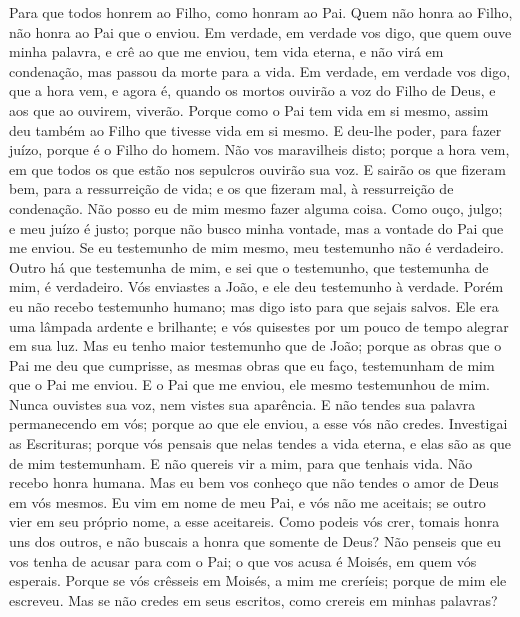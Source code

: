 {Para que todos honrem ao Filho, como honram ao Pai. Quem não honra ao Filho, não honra ao Pai que o enviou.
Em verdade, em verdade vos digo, que quem ouve minha palavra, e crê ao que me enviou, tem vida eterna, e não virá em condenação, mas passou da morte para a vida.
Em verdade, em verdade vos digo, que a hora vem, e agora é, quando os mortos ouvirão a voz do Filho de Deus, e aos que ao ouvirem, viverão.
Porque como o Pai tem vida em si mesmo, assim deu também ao Filho que tivesse vida em si mesmo.
E deu-lhe poder, para fazer juízo, porque é o Filho do homem.
Não vos maravilheis disto; porque a hora vem, em que todos os que estão nos sepulcros ouvirão sua voz.
E sairão os que fizeram bem, para a ressurreição de vida; e os que fizeram mal, à ressurreição de condenação.
Não posso eu de mim mesmo fazer alguma coisa. Como ouço,
{} julgo; e meu juízo é justo; porque não busco minha vontade, mas a vontade do Pai que me enviou.
Se eu testemunho de mim mesmo, meu testemunho não é verdadeiro.
Outro há que testemunha de mim, e sei que o testemunho, que testemunha de mim, é verdadeiro.
Vós enviastes
{} a João, e ele deu testemunho à verdade.
Porém eu não recebo testemunho humano; mas digo isto para que sejais salvos.
Ele era uma lâmpada ardente e brilhante; e vós quisestes por um pouco de tempo alegrar em sua luz.
Mas eu tenho maior testemunho que
{} de João; porque as obras que o Pai me deu que cumprisse, as mesmas obras que eu faço, testemunham de mim que o Pai me enviou.
E o Pai que me enviou, ele mesmo testemunhou de mim. Nunca ouvistes sua voz, nem vistes sua aparência.
E não tendes sua palavra permanecendo em vós; porque ao que ele enviou, a esse vós não credes.
Investigai as Escrituras; porque vós pensais que nelas tendes a vida eterna, e elas são as que de mim testemunham.
E não quereis vir a mim, para que tenhais vida.
Não recebo honra humana.
Mas eu bem vos conheço que não tendes o amor de Deus em vós mesmos.
Eu vim em nome de meu Pai, e vós não me aceitais; se outro vier em seu próprio nome, a esse aceitareis.
Como podeis vós crer,
{} tomais honra uns dos outros, e não buscais a honra que
{} somente de Deus?
Não penseis que eu vos tenha de acusar para com o Pai; o que vos acusa é Moisés, em quem vós esperais.
Porque se vós crêsseis em Moisés,
{} a mim me creríeis; porque de mim ele escreveu.
Mas se não credes em seus escritos, como crereis em minhas palavras?

}
